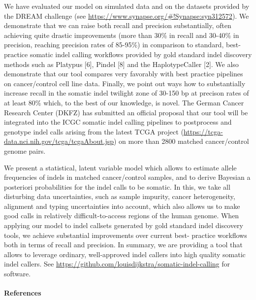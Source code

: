 We have evaluated our model on simulated data and on the datasets provided by the DREAM challenge
(see \url{https://www.synapse.org/#!Synapse:syn312572}). We demonstrate that we can raise
both recall and precision substantially, often achieving quite drastic improvements (more than 30\% in recall and 30-40\% in precision, reaching precision rates of 85-95\%) in comparison to standard, best-practice
somatic indel calling workflows provided by gold standard indel discovery methods such as Platypus [6],
Pindel [8] and the HaplotypeCaller [2]. We also demonstrate that our tool compares very favorably with
best practice pipelines on cancer/control cell line data. Finally, we point out ways how to substantially
increase recall in the somatic indel twilight zone of 30-150 bp at precison rates of at least 80\% which, to
the best of our knowledge, is novel. The German Cancer Research Center (DKFZ) has submitted an official proposal that our tool will be integrated into the ICGC somatic indel calling pipelines to postprocess
and genotype indel calls arising from the latest TCGA project (\url{https://tcga-data.nci.nih.gov/tcga/tcgaAbout.jsp}) on more than 2800 matched cancer/control genome pairs.

We present a statistical, latent variable model which allows to estimate allele frequencies
of indels in matched cancer/control samples, and to derive Bayesian a posteriori probabilities for the indel
calls to be somatic. In this, we take all disturbing data uncertainties, such as sample impurity, cancer
heterogeneity, alignment and typing uncertainties into account, which also allows us to make good calls
in relatively difficult-to-access regions of the human genome. When applying our model to indel callsets
generated by gold standard indel discovery tools, we achieve substantial improvements over current best-
practice workflows both in terms of recall and precision. In summary, we are providing a tool that allows
to leverage ordinary, well-approved indel callers into high quality somatic indel callers. See \url{https://github.com/louisdijkstra/somatic-indel-calling} for software.


\noindent
\paragraph{References} 
\noindent \paragraph{} 

